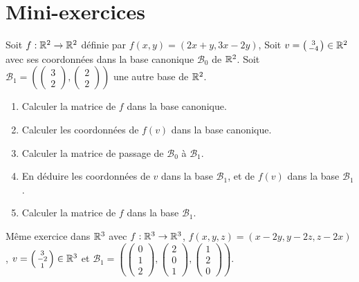\section{Mini-exercices}

\begin{frame}

\begin{miniexercice}
Soit $f : \mathbb{R}^2 \to \mathbb{R}^2$ définie par $f(x,y) = (2x+y,3x-2y)$,
Soit $v = \left(\begin{smallmatrix}3\\-4\end{smallmatrix}\right) \in \mathbb{R}^2$
avec ses coordonnées dans la base canonique $\mathcal{B}_0$ de $\mathbb{R}^2$.
Soit $\mathcal{B}_1 = \left( 
\left(\begin{smallmatrix}3\\2\end{smallmatrix}\right),
\left(\begin{smallmatrix}2\\2\end{smallmatrix}\right)
\right)$ une autre base de $\mathbb{R}^2$.
\begin{enumerate}
  \item Calculer la matrice de $f$ dans la base canonique.

  \item Calculer les coordonnées de $f(v)$ dans la base canonique.
  
  \item Calculer la matrice de passage de $\mathcal{B}_0$ à $\mathcal{B}_1$.
  
  \item En déduire les coordonnées de $v$ dans la base $\mathcal{B}_1$,
  et de $f(v)$ dans la base $\mathcal{B}_1$. 
  
  \item Calculer la matrice de $f$ dans la base $\mathcal{B}_1$.
\end{enumerate}
  

Même exercice dans $\mathbb{R}^3$ avec $f : \mathbb{R}^3 \to \mathbb{R}^3$, $f(x,y,z) = (x-2y,y-2z,z-2x)$,
$v = \left(\begin{smallmatrix}3\\-2\\1\end{smallmatrix}\right) \in \mathbb{R}^3$
et $\mathcal{B}_1 = \left( 
\left(\begin{smallmatrix}0\\1\\2\end{smallmatrix}\right),
\left(\begin{smallmatrix}2\\0\\1\end{smallmatrix}\right),
\left(\begin{smallmatrix}1\\2\\0\end{smallmatrix}\right)
\right)$.
  
\end{miniexercice}

\end{frame}

